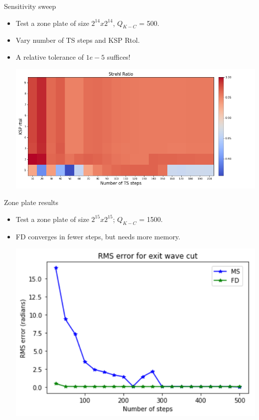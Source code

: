 \documentclass{beamer}
\begin{document}
\begin{frame}{Sensitivity sweep}
	\begin{itemize}
		\item Test a zone plate of size $2^{14} x 2^{14}$, $Q_{K-C}$ = 500. 
		\item Vary number of TS steps and KSP Rtol.
		\item A relative tolerance of $1e-5$ suffices!
		\begin{center}
		\includegraphics[scale=0.35]{sensitivity}
		\end{center}
		
	\end{itemize}
\end{frame}

\begin{frame}{Zone plate results}
	\begin{itemize}
		\item Test a zone plate of size $2^{15} x 2^{15}$; $Q_{K-C}$ = 1500.
	    \item FD converges in fewer steps, but needs more memory.
		\begin{center}
			\includegraphics[scale=0.5]{fdms2}
		\end{center}
	\end{itemize}
\end{frame}
\end{document}

